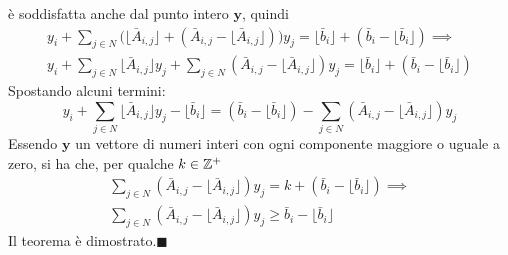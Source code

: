 \documentclass[10pt, letterpaper]{report}
\newcommand{\y}{{\mathbf{y}}}
\begin{document}
è soddisfatta anche dal punto intero $\y$, quindi 
\begin{eqnarray*}
    y_i + \sum_{j\in N}\Big(  \lfloor\bar A_{i,j}\rfloor + (\bar A_{i,j}-\lfloor\bar A_{i,j}\rfloor) \Big)y_j = \lfloor\bar b_i\rfloor + (\bar b_i-\lfloor\bar b_i\rfloor)\implies \\
     y_i + \sum_{j\in N}  \lfloor\bar A_{i,j}\rfloor y_j + \sum_{j\in N}  (\bar A_{i,j}-\lfloor\bar A_{i,j}\rfloor)y_j = \lfloor\bar b_i\rfloor + (\bar b_i-\lfloor\bar b_i\rfloor)
\end{eqnarray*}
Spostando alcuni termini:
$$ 
 y_i +
  \sum_{j\in N}  \lfloor\bar A_{i,j}\rfloor y_j -
  \lfloor\bar b_i\rfloor 
  =  
  (\bar b_i-\lfloor\bar b_i\rfloor) - \sum_{j\in N}  (\bar A_{i,j}-\lfloor\bar A_{i,j}\rfloor)y_j 
$$
Essendo $\y$ un vettore di numeri interi con ogni componente maggiore o uguale a zero, si ha che, per qualche $k\in{\mathbb Z}^+$
\begin{eqnarray*}
    \sum_{j\in N}  (\bar A_{i,j}-
    \lfloor\bar A_{i,j}\rfloor)y_j = k+ 
    (\bar b_i-\lfloor\bar b_i\rfloor) \implies \\
    \sum_{j\in N}  (\bar A_{i,j}-\lfloor
    \bar A_{i,j}\rfloor)y_j \ge  \bar b_i-\lfloor\bar b_i\rfloor
\end{eqnarray*}
Il teorema è dimostrato.\hfill$\blacksquare$
\end{document}
